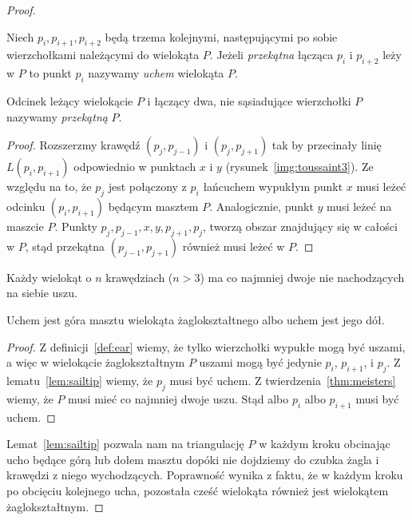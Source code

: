 \begin{proof}
  \begin{definicja}\label{def:ear}
    Niech $p_i, p_{i+1}, p_{i+2}$ będą trzema kolejnymi, następującymi
    po sobie wierzchołkami należącymi do wielokąta $P$. Jeżeli
    \emph{przekątna} łącząca $p_{i}$ i $p_{i+2}$ leży w $P$ to punkt
    $p_i$ nazywamy \emph{uchem} wielokąta $P$.
  \end{definicja}

  \begin{definicja}
    Odcinek leżący wielokącie $P$ i łączący dwa, nie sąsiadujące
    wierzchołki $P$ nazywamy \emph{przekątną} $P$.
  \end{definicja}

  \begin{proof}
    Rozszerzmy krawędź $(p_j,p_{j-1})$ i $(p_j, p_{j+1})$ tak by
    przecinały linię $L(p_i, p_{i+1})$ odpowiednio w punktach $x$ i
    $y$ (rysunek~\ref{img:toussaint3}). Ze względu na to, że $p_j$ jest
    połączony z $p_i$ łańcuchem wypukłym punkt $x$ musi leżeć odcinku
    $(p_i, p_{i+1})$ będącym masztem $P$. Analogicznie, punkt $y$ musi
    leżeć na maszcie $P$. Punkty $p_j, p_{j-1}, x, y, p_{j+1}, p_j$,
    tworzą obszar znajdujący się w całości w $P$, stąd przekątna
    $(p_{j-1}, p_{j+1})$ również musi leżeć w $P$.
  \end{proof}

  \begin{twierdzenie}\label{thm:meisters}
    Każdy wielokąt o $n$ krawędziach ($n > 3$) ma co najmniej dwoje nie
    nachodzących na siebie uszu.
  \end{twierdzenie}

  \begin{lemat}\label{lem:sailmast}
    Uchem jest góra masztu wielokąta żaglokształtnego albo uchem jest
    jego dół.
  \end{lemat}

  \begin{proof}
    Z definicji~\ref{def:ear} wiemy, że tylko wierzchołki wypukłe mogą
    być uszami, a więc w wielokącie żaglokształtnym $P$ uszami mogą
    być jedynie $p_i$, $p_{i+1}$, i $p_j$. Z lematu~\ref{lem:sailtip}
    wiemy, że $p_j$ musi być uchem. Z twierdzenia~\ref{thm:meisters}
    wiemy, że $P$ musi mieć co najmniej dwoje uszu. Stąd albo $p_i$
    albo $p_{i+1}$ musi być uchem.
  \end{proof}

  Lemat~\ref{lem:sailtip} pozwala nam na triangulację $P$ w każdym
  kroku obcinając ucho będące górą lub dołem masztu dopóki nie
  dojdziemy do czubka żagla i krawędzi z niego
  wychodzących. Poprawność wynika z faktu, że w każdym kroku po
  obcięciu kolejnego ucha, pozostała cześć wielokąta również jest
  wielokątem żaglokształtnym.
\end{proof}

